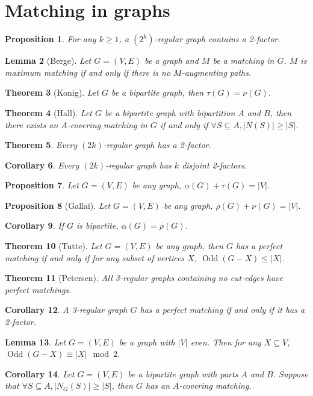 \documentclass[paper=a4, fontsize=12pt]{scrartcl} %
\newtheorem{thm}{Theorem}[section]
\newtheorem{cor}[thm]{Corollary}
\newtheorem{prop}[thm]{Proposition}
\newtheorem{lem}[thm]{Lemma}
\theoremstyle{definition}
\theoremstyle{remark}
\DeclareMathOperator{\odd}{Odd}
\numberwithin{equation}{section} %
\numberwithin{figure}{section} %
\numberwithin{table}{section} %
\begin{document}
\section{Matching in graphs}
\begin{prop}
	For any $k\geq 1$, a $(2^k)$-regular graph contains a 2-factor.
\end{prop}
\begin{lem}[Berge]
	Let $G = (V,E)$ be a graph and $M$ be a matching in $G$. $M$ is maximum matching if and only if there is no $M$-augmenting paths.
\end{lem}
\begin{thm}[Konig]
	Let $G$ be a bipartite graph, then $\tau(G) = \nu(G)$.
\end{thm}
\begin{thm}[Hall]
	Let $G$ be a bipartite graph with bipartition $A$ and $B$, then there exists an $A$-covering matching in $G$ if and only if $\forall S \subseteq A, |N(S)| \geq |S|$.
\end{thm}
\begin{thm}
	Every $(2k)$-regular graph has a 2-factor.
\end{thm}
\begin{cor}
	Every $(2k)$-regular graph has $k$ disjoint 2-factors.
\end{cor}
\begin{prop}
	Let $G=(V,E)$ be any graph, $\alpha(G) + \tau(G) = |V|$.
\end{prop}
\begin{prop}[Gallai]
	Let $G=(V,E)$ be any graph, $\rho(G) + \nu(G) = |V|$.
\end{prop}
\begin{cor}
	If $G$ is bipartite, $\alpha(G) = \rho(G)$.
\end{cor}
\begin{thm}[Tutte]
	Let $G = (V,E)$ be any graph, then $G$ has a perfect matching if and only if for any subset of vertices $X$, $\odd(G-X) \leq |X|$.
\end{thm}
\begin{thm}[Petersen]
	All 3-regular graphs containing no cut-edges have perfect matchings.
\end{thm}
\begin{cor}
	A 3-regular graph $G$ has a perfect matching if and only if it has a 2-factor.
\end{cor}
\begin{lem}
	Let $G = (V,E)$ be a graph with $|V|$ even. Then for any $X \subseteq V$, $\odd(G-X) \equiv |X| \mod{2}$.
\end{lem}
\begin{cor}
	Let $G = (V,E)$ be a bipartite graph with parts $A$ and $B$. Suppose that $\forall S \subseteq A, |N_G(S)| \geq |S|$, then $G$ has an $A$-covering matching.
\end{cor}
\end{document}
